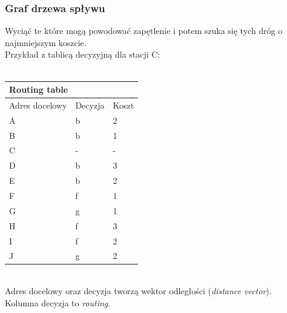 			\subsubsection{Graf drzewa spływu}
				Wyciąć te które mogą powodować zapętlenie i potem szuka się tych dróg o najmniejszym koszcie.\\
				Przykład z tablicą decyzyjną dla stacji C:\\\\
				\begin{tabular}{ccc}
					\multicolumn{3}{l}{Routing table}                                                                                                  \\ \hline
					\multicolumn{1}{l|}{Adres docelowy}  & \multicolumn{1}{l|}{Decyzja}         & \multicolumn{1}{l}{Koszt}                            \\ \hline
					\multicolumn{1}{l|}{A} & \multicolumn{1}{l|}{b}                & \multicolumn{1}{l}{2}                           \\
					\multicolumn{1}{l|}{B} & \multicolumn{1}{l|}{b}                & \multicolumn{1}{l}{1}                           \\
					\multicolumn{1}{l|}{C} & \multicolumn{1}{l|}{-}                & \multicolumn{1}{l}{-}                           \\
					\multicolumn{1}{l|}{D} & \multicolumn{1}{l|}{b}                & \multicolumn{1}{l}{3}                           \\
					\multicolumn{1}{l|}{E} & \multicolumn{1}{l|}{b}                & \multicolumn{1}{l}{2}                           \\
					\multicolumn{1}{l|}{F} & \multicolumn{1}{l|}{f}                & \multicolumn{1}{l}{1}                           \\
					\multicolumn{1}{l|}{G} & \multicolumn{1}{l|}{g}                & \multicolumn{1}{l}{1}                           \\
					\multicolumn{1}{l|}{H} & \multicolumn{1}{l|}{f}                & \multicolumn{1}{l}{3}                           \\
					\multicolumn{1}{l|}{I} & \multicolumn{1}{l|}{f}                & \multicolumn{1}{l}{2}                           \\
					\multicolumn{1}{l|}{J} & \multicolumn{1}{l|}{g}                & \multicolumn{1}{l}{2}                            
				\end{tabular}\\
				Adres docelowy oraz decyzja tworzą wektor odległości (\emph{distance vector}).\\
				Kolumna decyzja to \emph{routing}.\\
